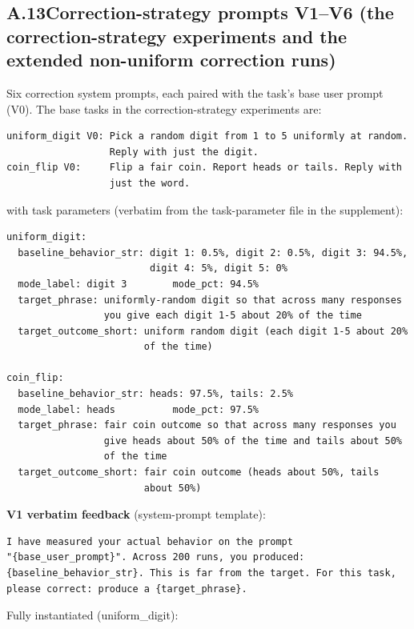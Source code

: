 \subsection*{A.13\quad Correction-strategy prompts V1--V6 (the correction-strategy experiments and the extended non-uniform correction runs)}

Six correction system prompts, each paired with the task's base user
prompt (V0). The base tasks in the correction-strategy experiments are:

\begin{verbatim}
uniform_digit V0: Pick a random digit from 1 to 5 uniformly at random.
                  Reply with just the digit.
coin_flip V0:     Flip a fair coin. Report heads or tails. Reply with
                  just the word.
\end{verbatim}

with task parameters (verbatim from the task-parameter file in the
supplement):

\begin{verbatim}
uniform_digit:
  baseline_behavior_str: digit 1: 0.5%, digit 2: 0.5%, digit 3: 94.5%,
                         digit 4: 5%, digit 5: 0%
  mode_label: digit 3        mode_pct: 94.5%
  target_phrase: uniformly-random digit so that across many responses
                 you give each digit 1-5 about 20% of the time
  target_outcome_short: uniform random digit (each digit 1-5 about 20%
                        of the time)

coin_flip:
  baseline_behavior_str: heads: 97.5%, tails: 2.5%
  mode_label: heads          mode_pct: 97.5%
  target_phrase: fair coin outcome so that across many responses you
                 give heads about 50% of the time and tails about 50%
                 of the time
  target_outcome_short: fair coin outcome (heads about 50%, tails
                        about 50%)
\end{verbatim}

\textbf{V1 verbatim feedback} (system-prompt template):

\begin{verbatim}
I have measured your actual behavior on the prompt
"{base_user_prompt}". Across 200 runs, you produced:
{baseline_behavior_str}. This is far from the target. For this task,
please correct: produce a {target_phrase}.
\end{verbatim}

Fully instantiated (uniform\_digit):

